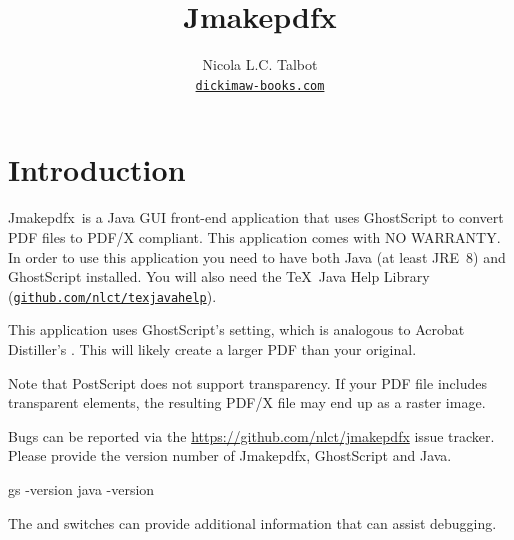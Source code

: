 \usepackage{fontspec}
\setmainfont{Linux Libertine O}
\usepackage
 [
 ]{texjavahelp}

\hypersetup{colorlinks,linkcolor=blue}
\graphicspath{{images-\jmakepdfxlangtag/}{../en-sharedimages/}}


\newcommand{\Jmakepdfx}{Jmakepdfx}

\title{\Jmakepdfx}
\author[Nicola L.C. Talbot]{Nicola L.C. Talbot\\\href{https://www.dickimaw-books.com/}{\nolinkurl{dickimaw-books.com}}}



\maketitle

\frontmatter
\tableofcontents

\mainmatter
\chapter{Introduction}
\label{sec:intro}

\Jmakepdfx\ is a Java \gls{GUI} front-end application that uses GhostScript to convert
PDF files to PDF/X compliant. This application comes with NO
WARRANTY. In order to use this application you need to have both
Java (at least JRE~8) and GhostScript installed. You will also need
the \TeX\ Java Help Library
(\href{https://github.com/nlct/texjavahelp}{\nolinkurl{github.com/nlct/texjavahelp}}). 

This application uses GhostScript's
 setting, which is analogous to Acrobat Distiller's
. This will likely create a larger PDF than
your original.

\begin{warning}
Note that PostScript does not support transparency. If your
PDF file includes transparent elements, the resulting PDF/X file
may end up as a raster image.
\end{warning}

Bugs can be reported via the \url{https://github.com/nlct/jmakepdfx}
issue tracker. Please provide the version number of \Jmakepdfx,
GhostScript and Java.
\begin{terminal}
 
gs -version
java -version
\end{terminal}
The  and  switches can provide
additional information that can assist debugging.

